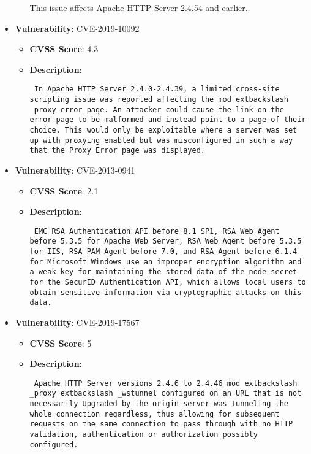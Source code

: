 \documentclass{article}
\begin{document}
\begin{itemize}
\begin{itemize}
{{This issue affects Apache HTTP Server 2.4.54 and earlier.
 }}
        \end{itemize}
    
        \item \textbf{Vulnerability}: CVE-2019-10092
        \begin{itemize}
            \item \textbf{CVSS Score}:  4.3 
            \item \textbf{Description}: \parbox{\linewidth}{\texttt{ In Apache HTTP Server 2.4.0-2.4.39, a limited cross-site scripting issue was reported affecting the mod	extbackslash _proxy error page. An attacker could cause the link on the error page to be malformed and instead point to a page of their choice. This would only be exploitable where a server was set up with proxying enabled but was misconfigured in such a way that the Proxy Error page was displayed. }}
        \end{itemize}
    
        \item \textbf{Vulnerability}: CVE-2013-0941
        \begin{itemize}
            \item \textbf{CVSS Score}:  2.1 
            \item \textbf{Description}: \parbox{\linewidth}{\texttt{ EMC RSA Authentication API before 8.1 SP1, RSA Web Agent before 5.3.5 for Apache Web Server, RSA Web Agent before 5.3.5 for IIS, RSA PAM Agent before 7.0, and RSA Agent before 6.1.4 for Microsoft Windows use an improper encryption algorithm and a weak key for maintaining the stored data of the node secret for the SecurID Authentication API, which allows local users to obtain sensitive information via cryptographic attacks on this data. }}
        \end{itemize}
    
        \item \textbf{Vulnerability}: CVE-2019-17567
        \begin{itemize}
            \item \textbf{CVSS Score}:  5 
            \item \textbf{Description}: \parbox{\linewidth}{\texttt{ Apache HTTP Server versions 2.4.6 to 2.4.46 mod	extbackslash _proxy	extbackslash _wstunnel configured on an URL that is not necessarily Upgraded by the origin server was tunneling the whole connection regardless, thus allowing for subsequent requests on the same connection to pass through with no HTTP validation, authentication or authorization possibly configured. }}
        \end{itemize}
    

\end{itemize}
\end{document}
